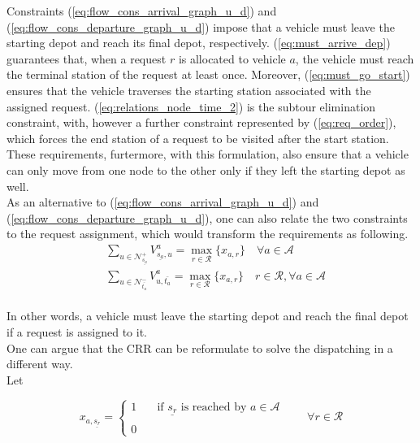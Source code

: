 Constraints (\ref{eq:flow_cons_arrival_graph_u_d}) and (\ref{eq:flow_cons_departure_graph_u_d}) impose that a vehicle must leave the starting depot and reach its final depot, respectively.  (\ref{eq:must_arrive_dep}) guarantees that, when a request $r$ is allocated to vehicle $a$, the vehicle must reach the terminal station of the request at least once. Moreover, (\ref{eq:must_go_start}) ensures that the vehicle traverses the starting station associated with the assigned request. (\ref{eq:relations_node_time_2}) is the subtour elimination constraint, with, however a further constraint represented by (\ref{eq:req_order}), which forces the end station of a request to be visited after the start station. \\
These requirements, furtermore, with this formulation, also ensure that a vehicle can only move from one node to the other only if they left the starting depot as well. \\ 
As an alternative to (\ref{eq:flow_cons_arrival_graph_u_d}) and (\ref{eq:flow_cons_departure_graph_u_d}), one can also relate the two constraints to the request assignment, which would transform the requirements as following. 
\begin{equation}
\begin{aligned}
	&\sum_{ u \in \mathcal{N}^+_{\underline{s_a}} }V^a_{ \underline{s_a},u} = \underset{ r \in \mathcal{R}}{\max}\{x_{a,r}\} \quad  \forall a \in \mathcal{A}\\ %
	&\sum_{u \in \mathcal{N}^-_{\bar{t_a}} } V^a_{u, \bar{t_a}} = \underset{ r \in \mathcal{R}}{\max}\{x_{a,r}\}  \quad r \in \mathcal{R},  \forall a \in \mathcal{A}
\end{aligned}
 \label{eq:alternative_constraint_depots}
\end{equation}
\\
In other words, a vehicle must leave the starting depot and reach the final depot if a request is assigned to it. \\
One can argue that the CRR can be reformulate to solve the dispatching in a different way. \\
Let 

\begin{equation*}
	x_{a,\underline{s_r} }= 
	\begin{cases} 
		1 & \quad \text{if $\underline{s_r} $ is reached by }  a \in \mathcal{A}\\
		\\
		0
	\end{cases}
	\quad\quad \forall r \in \mathcal{R}
	\label{eq:var_dispatching}
\end{equation*}

